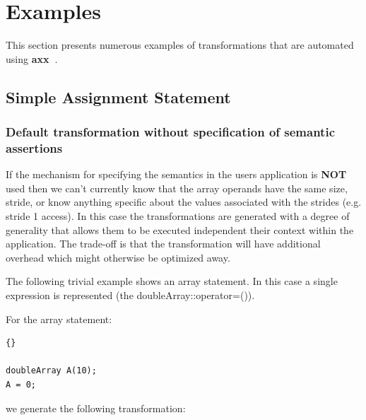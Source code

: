 \documentclass[10pt]{article}
\newcommand{\axx}{{\bf axx\ }}
\begin{document}
\section{Examples}
    This section presents numerous examples of transformations that are automated using \axx.

\subsection{Simple Assignment Statement}

\subsubsection{Default transformation without specification of semantic assertions}

    If the mechanism for specifying the semantics in the users application is {\bf NOT} used then we
can't currently know that the array operands have the same size, stride, or know anything specific
about the values associated with the strides (e.g. stride 1 access).  In this case the
transformations are generated with a degree of generality that allows them to be executed
independent their context within the application.  The trade-off is that the transformation will
have additional overhead which might otherwise be optimized away.


   The following trivial example shows an array statement.  In this case a single expression is represented
(the doubleArray::operator=()).

   For the array statement:
\vspace{0.5in}

\begin{lstlisting}{}

doubleArray A(10);
A = 0;

\end{lstlisting}


   we generate the following transformation:

\vspace{0.5in}
\end{document}
